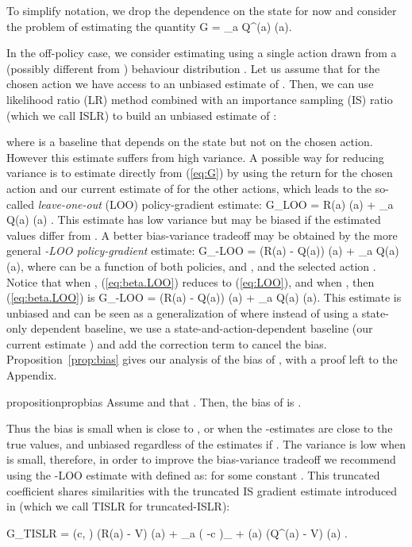 \documentclass{article}
\newcommand{\beq}{}
\newcommand{\beqan}{}
\newcommand{\action}{{\hat a}}
\begin{document}
To simplify notation, we drop the dependence on the state  for now and 
consider the problem of estimating the quantity
\beq\label{eq:G}
G = {\textstyle \sum_a } Q^{\pi}(a) \nabla \pi(a).
\eeq

In the off-policy case, we consider estimating  using a single action  
drawn from a (possibly different from ) behaviour distribution 
. Let us assume that for the chosen action  we have access to an 
unbiased estimate  of . Then, we can use likelihood ratio (LR) 
method combined with an importance sampling (IS) ratio (which we call ISLR) to 
build an unbiased estimate of :

where  is a baseline that depends on the state but not on the chosen action. 
However this estimate suffers from high variance. A possible way for reducing 
variance is to estimate  directly from (\ref{eq:G}) by using the return 
 for the chosen action  and our current estimate  of  for 
the other actions, which leads to the so-called {\em leave-one-out} (LOO) 
policy-gradient estimate:
\beq\label{eq:LOO}
\hat G_{\mbox{\tiny LOO}} = R(\action) \nabla \pi(\action) + {\textstyle \sum_{a\neq \action} } 
Q(a) \nabla 
\pi(a) .
\eeq
This estimate has low variance but may be biased if the estimated  values 
differ from . A better bias-variance tradeoff may be obtained by 
the more general {\em -LOO policy-gradient} estimate:
\beq\label{eq:beta.LOO}
\hat G_{\mbox{\tiny -LOO}} = \beta (R(\action) - Q(\action)) \nabla \pi(\action) + 
{\textstyle \sum_{a} }
 Q(a) \nabla \pi(a),
\eeq
where  can be a function of both policies,  and 
, and the selected action . Notice that when , 
(\ref{eq:beta.LOO}) reduces to (\ref{eq:LOO}), and when , then 
(\ref{eq:beta.LOO}) is
\beq \label{eq:1/mu.loo}
\hat G_{\mbox{\tiny -LOO}} = 
\frac{\pi(\action)}{\mu(\action)} (R(\action) - Q(\action)) \nabla\log\pi(\action) + {\textstyle \sum_a } 
Q(a) 
\nabla\pi(a).
\eeq
This estimate is unbiased and can be seen as a generalization of  where instead of using a state-only dependent baseline, 
we use a state-and-action-dependent baseline (our current estimate ) and add 
the correction term  to cancel the bias. 
Proposition~\ref{prop:bias} gives our analysis of the bias of \beta, with a proof left to the Appendix.
\begin{restatable}{proposition}{propbias}\label{prop:bias}
Assume  and that . Then, 
the bias of \beta is .
\end{restatable}
Thus the bias is small when  is close to , or 
when the -estimates are close to the true  values, and unbiased
regardless of the estimates if . The variance 
is low when  is small, therefore, in order to improve the bias-variance tradeoff 
we recommend using the -LOO estimate with  defined as:
 for some constant
. This truncated  coefficient shares similarities with the truncated IS 
gradient estimate introduced in \citep{wang2017sample} (which we call TISLR for 
truncated-ISLR):
\beqan
\hat G_{\mbox{\tiny TISLR}}\! = \!\min\Big(c, \frac{\pi(\action)}{\mu(\action)}\Big) 
(R(\action) - V) \nabla\log\pi(\action)  \! + \! \sum_a \Big( -c 
\Big)_{\!\! +} \mu(a) 
(Q^{\pi}(a) - V) \nabla\log\pi(a) .
\eeqan
\end{document}
